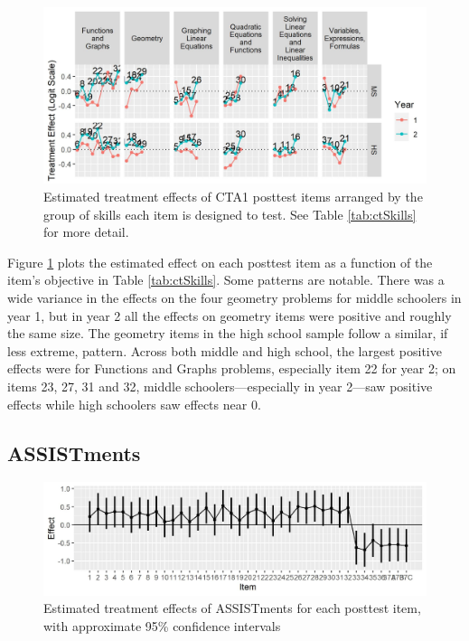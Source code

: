 \documentclass{edm_article}
\begin{document}
\begin{figure}
  \centering
  \includegraphics{../ctEffectsType.jpg}
  \caption{Estimated treatment effects of CTA1 posttest items arranged
    by the group of skills each item is designed to test. See Table
    \ref{tab:ctSkills} for more detail.}
  \label{fig:cta1ResultsType}
\end{figure}

Figure \ref{fig:cta1ResultsType} plots the estimated effect on each
posttest item as a function of the item's objective in Table
\ref{tab:ctSkills}.
Some patterns are notable.
There was a wide variance in the effects on the four geometry problems
for middle schoolers in year 1, but in year 2 all the effects on
geometry items were positive and roughly the same size.
The geometry items in the high school sample follow a similar, if less
extreme, pattern.
Across both middle and high school, the largest positive effects were
for Functions and Graphs problems, especially item 22 for year 2; on items 23,
27, 31 and 32, middle schoolers---especially in year 2---saw positive
effects while high schoolers saw effects near 0.

\subsection{ASSISTments}
\begin{figure}
  \centering
  \includegraphics{../assEffects.jpg}
  \caption{Estimated treatment effects of ASSISTments for each posttest item, with
    approximate 95\% confidence intervals}
  \label{fig:assResults1}
\end{figure}
\end{document}
